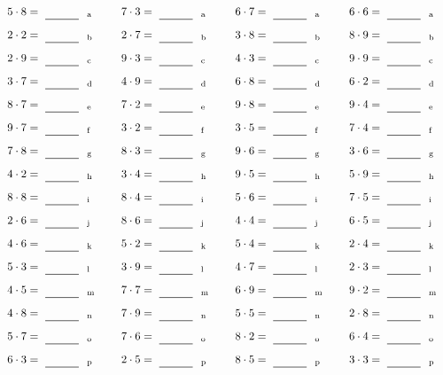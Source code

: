 \documentclass
[
  draft    = true,
  fontsize = 11pt,
  parskip  = half-
]
{scrartcl}
\begin{document}
\par\vfill\par
\begin{align*}
    \pline{5\cdot8}&=\rline{a}
  & \pline{7\cdot3}&=\rline{a}
  & \pline{6\cdot7}&=\rline{a}
  & \pline{6\cdot6}&=\rline{a} \\[1ex]
    \pline{2\cdot2}&=\rline{b}
  & \pline{2\cdot7}&=\rline{b}
  & \pline{3\cdot8}&=\rline{b}
  & \pline{8\cdot9}&=\rline{b} \\[1ex]
    \pline{2\cdot9}&=\rline{c}
  & \pline{9\cdot3}&=\rline{c}
  & \pline{4\cdot3}&=\rline{c}
  & \pline{9\cdot9}&=\rline{c} \\[1ex]
    \pline{3\cdot7}&=\rline{d}
  & \pline{4\cdot9}&=\rline{d}
  & \pline{6\cdot8}&=\rline{d}
  & \pline{6\cdot2}&=\rline{d} \\[1ex]
    \pline{8\cdot7}&=\rline{e}
  & \pline{7\cdot2}&=\rline{e}
  & \pline{9\cdot8}&=\rline{e}
  & \pline{9\cdot4}&=\rline{e} \\[1ex]
    \pline{9\cdot7}&=\rline{f}
  & \pline{3\cdot2}&=\rline{f}
  & \pline{3\cdot5}&=\rline{f}
  & \pline{7\cdot4}&=\rline{f} \\[1ex]
    \pline{7\cdot8}&=\rline{g}
  & \pline{8\cdot3}&=\rline{g}
  & \pline{9\cdot6}&=\rline{g}
  & \pline{3\cdot6}&=\rline{g} \\[1ex]
    \pline{4\cdot2}&=\rline{h}
  & \pline{3\cdot4}&=\rline{h}
  & \pline{9\cdot5}&=\rline{h}
  & \pline{5\cdot9}&=\rline{h} \\[1ex]
    \pline{8\cdot8}&=\rline{i}
  & \pline{8\cdot4}&=\rline{i}
  & \pline{5\cdot6}&=\rline{i}
  & \pline{7\cdot5}&=\rline{i} \\[1ex]
    \pline{2\cdot6}&=\rline{j}
  & \pline{8\cdot6}&=\rline{j}
  & \pline{4\cdot4}&=\rline{j}
  & \pline{6\cdot5}&=\rline{j} \\[1ex]
    \pline{4\cdot6}&=\rline{k}
  & \pline{5\cdot2}&=\rline{k}
  & \pline{5\cdot4}&=\rline{k}
  & \pline{2\cdot4}&=\rline{k} \\[1ex]
    \pline{5\cdot3}&=\rline{l}
  & \pline{3\cdot9}&=\rline{l}
  & \pline{4\cdot7}&=\rline{l}
  & \pline{2\cdot3}&=\rline{l} \\[1ex]
    \pline{4\cdot5}&=\rline{m}
  & \pline{7\cdot7}&=\rline{m}
  & \pline{6\cdot9}&=\rline{m}
  & \pline{9\cdot2}&=\rline{m} \\[1ex]
    \pline{4\cdot8}&=\rline{n}
  & \pline{7\cdot9}&=\rline{n}
  & \pline{5\cdot5}&=\rline{n}
  & \pline{2\cdot8}&=\rline{n} \\[1ex]
    \pline{5\cdot7}&=\rline{o}
  & \pline{7\cdot6}&=\rline{o}
  & \pline{8\cdot2}&=\rline{o}
  & \pline{6\cdot4}&=\rline{o} \\[1ex]
    \pline{6\cdot3}&=\rline{p}
  & \pline{2\cdot5}&=\rline{p}
  & \pline{8\cdot5}&=\rline{p}
  & \pline{3\cdot3}&=\rline{p}
\end{align*}
\end{document}
